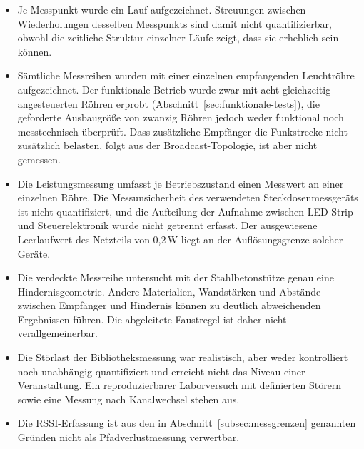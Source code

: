 \begin{itemize}
  \item Je Messpunkt wurde ein Lauf aufgezeichnet. Streuungen zwischen
    Wiederholungen desselben Messpunkts sind damit nicht quantifizierbar, obwohl
    die zeitliche Struktur einzelner Läufe zeigt, dass sie erheblich sein können.
  \item Sämtliche Messreihen wurden mit einer einzelnen empfangenden Leuchtröhre
    aufgezeichnet. Der funktionale Betrieb wurde zwar mit acht gleichzeitig
    angesteuerten Röhren erprobt (Abschnitt~\ref{sec:funktionale-tests}), die
    geforderte Ausbaugröße von zwanzig Röhren jedoch weder funktional noch
    messtechnisch überprüft. Dass zusätzliche Empfänger die Funkstrecke nicht
    zusätzlich belasten, folgt aus der Broadcast-Topologie, ist aber nicht
    gemessen.
  \item Die Leistungsmessung umfasst je Betriebszustand einen Messwert an einer
    einzelnen Röhre. Die Messunsicherheit des verwendeten Steckdosenmessgeräts
    ist nicht quantifiziert, und die Aufteilung der Aufnahme zwischen LED-Strip
    und Steuerelektronik wurde nicht getrennt erfasst. Der ausgewiesene
    Leerlaufwert des Netzteils von 0,2\,W liegt an der Auflösungsgrenze solcher
    Geräte.
  \item Die verdeckte Messreihe untersucht mit der Stahlbetonstütze genau eine
    Hindernisgeometrie. Andere Materialien, Wandstärken und Abstände zwischen
    Empfänger und Hindernis können zu deutlich abweichenden Ergebnissen führen.
    Die abgeleitete Faustregel ist daher nicht verallgemeinerbar.
  \item Die Störlast der Bibliotheksmessung war realistisch, aber weder
    kontrolliert noch unabhängig quantifiziert und erreicht nicht das Niveau
    einer Veranstaltung. Ein reproduzierbarer Laborversuch mit definierten
    Störern sowie eine Messung nach Kanalwechsel stehen aus.
  \item Die RSSI-Erfassung ist aus den in Abschnitt~\ref{subsec:messgrenzen}
    genannten Gründen nicht als Pfadverlustmessung verwertbar.
\end{itemize}
